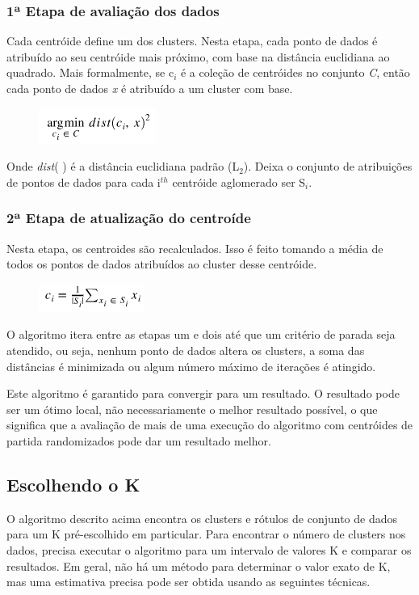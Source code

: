 \documentclass[12pt]{article}
\begin{document}
\subsubsection{1ª Etapa de avaliação dos dados}
Cada centróide define um dos clusters. Nesta etapa, cada ponto de dados é atribuído ao seu centróide mais próximo, com base na distância euclidiana ao quadrado. Mais formalmente, se c$_{i}$ é a coleção de centróides no conjunto \textit{C}, então cada ponto de dados \textit{x} é atribuído a um cluster com base.
\begin{figure}[H]
	\centering
	\includegraphics[width=0.20\columnwidth]{imagem/formula}
\end{figure}
Onde \textit{dist}( ) é a distância euclidiana padrão (L$_{2}$). Deixa o conjunto de atribuições de pontos de dados para cada i$^{th}$ centróide aglomerado ser S$_{i}$.
\subsubsection{2ª Etapa de atualização do centroíde}
Nesta etapa, os centroides são recalculados. Isso é feito tomando a média de todos os pontos de dados atribuídos ao cluster desse centróide.
\begin{figure}[H]
	\centering
	\includegraphics[width=0.20\columnwidth]{imagem/formula2}
\end{figure}
O algoritmo itera entre as etapas um e dois até que um critério de parada seja atendido, ou seja, nenhum ponto de dados altera os clusters, a soma das distâncias é minimizada ou algum número máximo de iterações é atingido.

Este algoritmo é garantido para convergir para um resultado. O resultado pode ser um ótimo local, não necessariamente o melhor resultado possível, o que significa que a avaliação de mais de uma execução do algoritmo com centróides de partida randomizados pode dar um resultado melhor.
\subsection{Escolhendo o K}
O algoritmo descrito acima encontra os clusters e rótulos de conjunto de dados para um K pré-escolhido em particular. Para encontrar o número de clusters nos dados, precisa executar o algoritmo para um intervalo de  valores K e comparar os resultados. Em geral, não há um método para determinar o valor exato de K, mas uma estimativa precisa pode ser obtida usando as seguintes técnicas.
\end{document}
